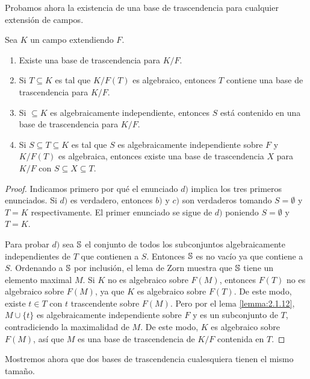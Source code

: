 Probamos ahora la existencia de una base de trascendencia para cualquier extensión de campos.

\begin{theorem}
  Sea $K$ un campo extendiendo $F$.
  \begin{enumerate}
    \item Existe una base de trascendencia para $K/F$.
    \item Si $T \subseteq K$ es tal que $K/F(T)$ es algebraico, entonces $T$ contiene una base de trascendencia para $K/F$.
    \item Si $\subseteq K$ es algebraicamente independiente, entonces $S$ está contenido en una base de trascendencia para $K/F$.
    \item Si $S \subseteq T \subseteq K$ es tal que $S$ es algebraicamente independiente sobre $F$ y $K/F(T)$ es algebraica, entonces existe una base de trascendencia $X$ para $K/F$ con $S \subseteq X \subseteq T$.
  \end{enumerate}
\end{theorem}
\begin{proof}
  Indicamos primero por qué el enunciado $d)$ implica los tres primeros enunciados. Si $d)$ es verdadero, entonces $b)$ y $c)$ son verdaderos tomando $S = \emptyset$ y $T = K$ respectivamente. El primer enunciado se sigue de $d)$ poniendo $S = \emptyset$ y $T = K$.

  Para probar $d)$ sea $\mathbb{S}$ el conjunto de todos los subconjuntos algebraicamente independientes de $T$ que contienen a $S$. Entonces $\mathbb{S}$ es no vacío ya que contiene a $S$. Ordenando a $\mathbb{S}$ por inclusión, el lema de Zorn muestra que $\mathbb{S}$ tiene un elemento maximal $M$. Si $K$ no es algebraico sobre $F(M)$, entonces $F(T)$ no es algebraico sobre $F(M)$, ya que $K$ es algebraico sobre $F(T)$. De este modo, existe $t \in T$ con $t$ trascendente sobre $F(M)$. Pero por el lema \ref{lemma:2.1.12}, $M \cup \{t\}$ es algebraicamente independiente sobre $F$ y es un subconjunto de $T$, contradiciendo la maximalidad de $M$. De este modo, $K$ es algebraico sobre $F(M)$, así que $M$ es una base de trascendencia de $K/F$ contenida en $T$.
\end{proof}

Mostremos ahora que dos bases de trascendencia cualesquiera tienen el mismo tamaño.

